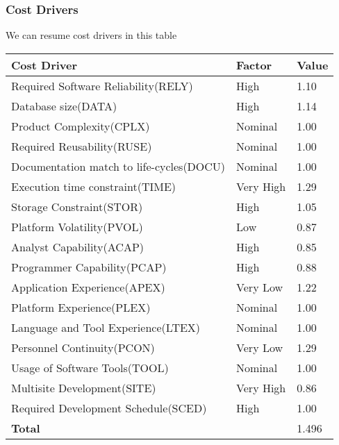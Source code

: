 \subsubsection{Cost Drivers}



















We can resume cost drivers in this table\\
\begin{tabular}{|p{8cm}|p{3cm}|p{2cm}|}
\hline
\textbf{Cost Driver} & \textbf{Factor} & \textbf{Value}\\
\hline
Required Software Reliability(RELY) & High & 1.10\\
Database size(DATA) & High & 1.14\\
Product Complexity(CPLX) & Nominal & 1.00\\
Required Reusability(RUSE) & Nominal & 1.00\\
Documentation match to life-cycles(DOCU) & Nominal & 1.00\\
Execution time constraint(TIME) & Very High & 1.29\\
Storage Constraint(STOR) & High & 1.05\\
Platform Volatility(PVOL) & Low & 0.87\\
Analyst Capability(ACAP) & High & 0.85\\
Programmer Capability(PCAP) & High & 0.88\\
Application Experience(APEX) & Very Low & 1.22\\
Platform Experience(PLEX) & Nominal & 1.00\\
Language and Tool Experience(LTEX) & Nominal & 1.00\\
Personnel Continuity(PCON) & Very Low & 1.29\\
Usage of Software Tools(TOOL) & Nominal & 1.00\\
Multisite Development(SITE) & Very High & 0.86\\
Required Development Schedule(SCED) & High & 1.00\\
\hline
\multicolumn{2}{|l|}{\textbf{Total}} & 1.496\\
\hline
\end{tabular}
